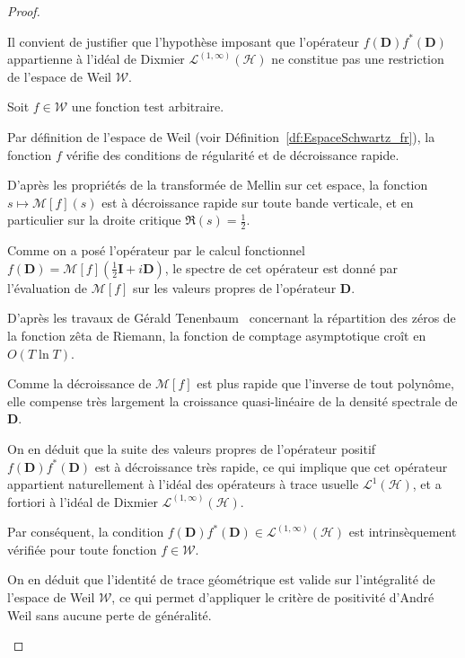 \documentclass[Riemann_Hypothesis.tex]{subfiles}
\begin{document}
\begin{proof}
    \begin{part_proof}
        Il convient de justifier que l'hypothèse imposant que l'opérateur $f(\mathbf{D}) f^*(\mathbf{D})$ appartienne à l'idéal de Dixmier $\mathcal{L}^{(1, \infty)}(\mathcal{H})$ ne constitue pas une restriction de l'espace de Weil $\mathcal{W}$. \par
        Soit $f \in \mathcal{W}$ une fonction test arbitraire. \par
        Par définition de l'espace de Weil (voir Définition~\ref{df:EspaceSchwartz_fr}), la fonction $f$ vérifie des conditions de régularité et de décroissance rapide. \par
        D'après les propriétés de la transformée de Mellin sur cet espace, la fonction $s \mapsto \mathcal{M}[f](s)$ est à décroissance rapide sur toute bande verticale, et en particulier sur la droite critique $\Re(s) = \frac{1}{2}$. \par
        Comme on a posé l'opérateur par le calcul fonctionnel $f(\mathbf{D}) = \mathcal{M}[f]\left(\frac{1}{2}\mathbf{I} + i\mathbf{D}\right)$, le spectre de cet opérateur est donné par l'évaluation de $\mathcal{M}[f]$ sur les valeurs propres de l'opérateur $\mathbf{D}$. \par
        D'après les travaux de Gérald Tenenbaum~\cite{von-Manglot_tenenbaum2015_intro} concernant la répartition des zéros de la fonction zêta de Riemann, la fonction de comptage asymptotique croît en $O(T \ln T)$. \par
        Comme la décroissance de $\mathcal{M}[f]$ est plus rapide que l'inverse de tout polynôme, elle compense très largement la croissance quasi-linéaire de la densité spectrale de $\mathbf{D}$. \par
        On en déduit que la suite des valeurs propres de l'opérateur positif $f(\mathbf{D}) f^*(\mathbf{D})$ est à décroissance très rapide, ce qui implique que cet opérateur appartient naturellement à l'idéal des opérateurs à trace usuelle $\mathcal{L}^1(\mathcal{H})$, et a fortiori à l'idéal de Dixmier $\mathcal{L}^{(1, \infty)}(\mathcal{H})$. \par
        Par conséquent, la condition $f(\mathbf{D}) f^*(\mathbf{D}) \in \mathcal{L}^{(1, \infty)}(\mathcal{H})$ est intrinsèquement vérifiée pour toute fonction $f \in \mathcal{W}$. \par
        On en déduit que l'identité de trace géométrique est valide sur l'intégralité de l'espace de Weil $\mathcal{W}$, ce qui permet d'appliquer le critère de positivité d'André Weil sans aucune perte de généralité.

\end{part_proof}
\end{proof}
\end{document}
